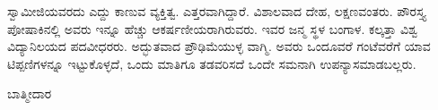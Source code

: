 ಸ್ವಾಮೀಜಿಯವರದು ಎದ್ದು ಕಾಣುವ ವ್ಯಕ್ತಿತ್ವ. ಎತ್ತರವಾಗಿದ್ದಾರೆ. ವಿಶಾಲವಾದ ದೇಹ, ಲಕ್ಷಣವಂತರು. ಪೌರಸ್ತ್ಯ ಪೋಷಾಕಿನಲ್ಲಿ ಅವರು ಇನ್ನೂ ಹೆಚ್ಚು ಆಕರ್ಷಣೀಯರಾಗಿರುವರು. ಇವರ ಜನ್ಮ ಸ್ಥಳ ಬಂಗಾಳ. ಕಲ್ಕತ್ತಾ ವಿಶ್ವ ವಿದ್ಯಾನಿಲಯದ ಪದವೀಧರರು. ಅದ್ಭುತವಾದ ಪ್ರೌಢಿಮೆಯುಳ್ಳ ವಾಗ್ಮಿ. ಅವರು ಒಂದೂವರೆ ಗಂಟೆವರೆಗೆ ಯಾವ ಟಿಪ್ಪಣಿಗಳನ್ನೂ ಇಟ್ಟುಕೊಳ್ಳದೆ, ಒಂದು ಮಾತಿಗೂ ತಡವರಿಸದೆ ಒಂದೇ ಸಮನಾಗಿ ಉಪನ್ಯಾಸಮಾಡಬಲ್ಲರು.

\begin{flushright}
ಬಾತ್ಮೀದಾರ
\end{flushright}

